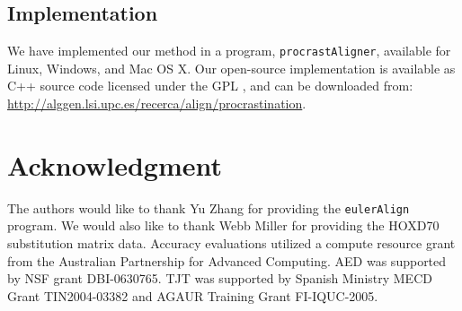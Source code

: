\documentclass[10pt,journal,letterpaper,compsoc,peerreview]{IEEEtran}
\begin{document}
\subsection{Implementation}
We have implemented our method in a program, \texttt{procrastAligner},
available for Linux, Windows, and Mac OS X. Our open-source
implementation is available as C++ source code licensed under the GPL , and can be downloaded from:
\url{http://alggen.lsi.upc.es/recerca/align/procrastination}.

\section{ Acknowledgment }
The authors would like to thank Yu Zhang for providing the
\texttt{eulerAlign} program. We would also like to thank
Webb Miller for providing the HOXD70 substitution matrix data. Accuracy
evaluations utilized a compute resource grant from the Australian
Partnership for Advanced Computing.  AED was supported by NSF grant
DBI-0630765. TJT was supported by Spanish Ministry MECD Grant
TIN2004-03382 and AGAUR Training Grant FI-IQUC-2005.



%
%
%



%





\end{document}
